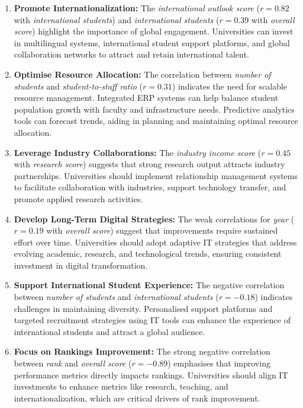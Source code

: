 \documentclass[sigconf]{acmart}
\begin{document}
\begin{enumerate}
	\item \textbf{Promote Internationalization:} The \textit{international outlook score} (\(r = 0.82\) with \textit{international students}) and \textit{international students} (\(r = 0.39\) with \textit{overall score}) highlight the importance of global engagement. Universities can invest in multilingual systems, international student support platforms, and global collaboration networks to attract and retain international talent.
	
	\item \textbf{Optimise Resource Allocation:} The correlation between \textit{number of students} and \textit{student-to-staff ratio} (\(r = 0.31\)) indicates the need for scalable resource management. Integrated ERP systems can help balance student population growth with faculty and infrastructure needs. Predictive analytics tools can forecast trends, aiding in planning and maintaining optimal resource allocation.
	
	\item \textbf{Leverage Industry Collaborations:} The \textit{industry income score} (\(r = 0.45\) with \textit{research score}) suggests that strong research output attracts industry partnerships. Universities should implement relationship management systems to facilitate collaboration with industries, support technology transfer, and promote applied research activities.
	
	\item \textbf{Develop Long-Term Digital Strategies:} The weak correlations for \textit{year} (\(r = 0.19\) with \textit{overall score}) suggest that improvements require sustained effort over time. Universities should adopt adaptive IT strategies that address evolving academic, research, and technological trends, ensuring consistent investment in digital transformation.
	
	\item \textbf{Support International Student Experience:} The negative correlation between \textit{number of students} and \textit{international students} (\(r = -0.18\)) indicates challenges in maintaining diversity. Personalised support platforms and targeted recruitment strategies using IT tools can enhance the experience of international students and attract a global audience.
	
	\item \textbf{Focus on Rankings Improvement:} The strong negative correlation between \textit{rank} and \textit{overall score} (\(r = -0.89\)) emphasises that improving performance metrics directly impacts rankings. Universities should align IT investments to enhance metrics like research, teaching, and internationalization, which are critical drivers of rank improvement.
	

\end{enumerate}
\end{document}
